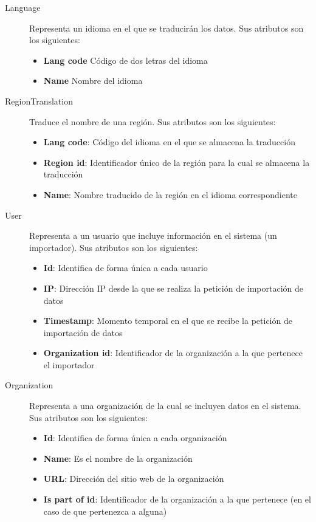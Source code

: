 \begin{description}
	\item[Language]  Representa un idioma en el que se traducirán los datos.  Sus atributos son los siguientes:
		\begin{itemize}
			\item \textbf{Lang code}  Código de dos letras del idioma
			\item \textbf{Name}  Nombre del idioma
		\end{itemize}
	\item[RegionTranslation]  Traduce el nombre de una región.  Sus atributos son los siguientes:
		\begin{itemize}
			\item \textbf{Lang code}:  Código del idioma en el que se almacena la traducción
			\item \textbf{Region id}:  Identificador único de la región para la cual se almacena la traducción
			\item \textbf{Name}:  Nombre traducido de la región en el idioma correspondiente
		\end{itemize}
	\item[User]  Representa a un usuario que incluye información en el sistema (un importador).  Sus atributos son los siguientes:
		\begin{itemize}
			\item \textbf{Id}:  Identifica de forma única a cada usuario
			\item \textbf{IP}:  Dirección IP desde la que se realiza la petición de importación de datos
			\item \textbf{Timestamp}:  Momento temporal en el que se recibe la petición de importación de datos
			\item \textbf{Organization id}:  Identificador de la organización a la que pertenece el importador
		\end{itemize}
	\item[Organization]  Representa a una organización de la cual se incluyen datos en el sistema.  Sus atributos son los siguientes:
		\begin{itemize}
			\item \textbf{Id}:  Identifica de forma única a cada organización
			\item \textbf{Name}:  Es el nombre de la organización
			\item \textbf{URL}:  Dirección del sitio web de la organización
			\item \textbf{Is part of id}:  Identificador de la organización a la que pertenece (en el caso de que pertenezca a alguna)

\end{itemize}
\end{description}
